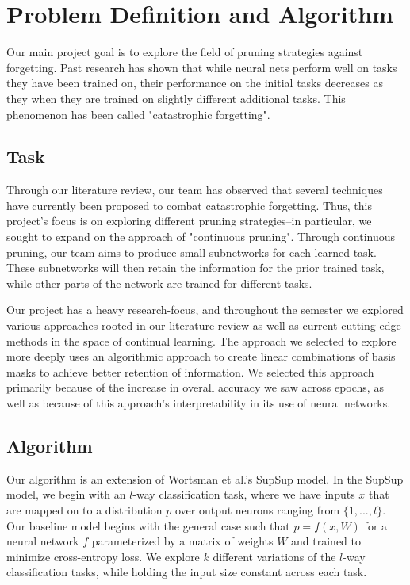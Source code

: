 \documentclass{article}
\begin{document}
\section{Problem Definition and Algorithm}

Our main project goal is to explore the field of pruning strategies against forgetting. Past research has shown that while neural nets perform well on tasks they have been trained on, their performance on the initial tasks decreases as they when they are trained on slightly different additional tasks. This phenomenon has been called "catastrophic forgetting".

\subsection{Task}
Through our literature review, our team has observed that several techniques have currently been proposed to combat catastrophic forgetting. Thus, this project's focus is on exploring different pruning strategies--in particular, we sought to expand on the approach of "continuous pruning". Through continuous pruning, our team aims to produce small subnetworks for each learned task. These subnetworks will then retain the information for the prior trained task, while other parts of the network are trained for different tasks. 

Our project has a heavy research-focus, and throughout the semester we explored various approaches rooted in our literature review as well as current cutting-edge methods in the space of continual learning. The approach we selected to explore more deeply uses an algorithmic approach to create linear combinations of basis masks to achieve better retention of information. We selected this approach primarily because of the increase in overall accuracy we saw across epochs, as well as because of this approach's interpretability in its use of neural networks. 

\subsection{Algorithm}

Our algorithm is an extension of Wortsman et al.'s SupSup model. In the SupSup model, we begin with an $l$-way classification task, where we have inputs $x$ that are mapped on to a distribution $p$ over output neurons ranging from $\{1, ..., l\}$. Our baseline model begins with the general case such that $p = f(x, W)$ for a neural network $f$ parameterized by a matrix of weights $W$ and trained to minimize cross-entropy loss. We explore $k$ different variations of the $l$-way classification tasks, while holding the input size constant across each task. 
\end{document}
